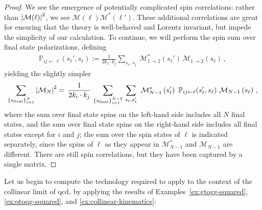 \begin{proof}
We see the emergence of potentially complicated spin correlations:
%
rather than \(\abs{\mathcal{M}(\ell)}^2\), we see \(\mathcal{M}(\ell) \mathcal{M}^*(\ell')\).
%
These additional correlations are great for ensuring that the theory is well-behaved and Lorentz invariant, but impede the simplicity of our calculation.
%
To continue, we will perform the spin sum over final state polarizations, defining
%
%
\begin{align}
    \mathbb{P}_{ij \leftarrow \ell}(s_\ell', s_\ell)
    :=
    \frac{1}{2 k_i \cdot k_j}
    \sum_{s_i,\, s_j}
    \,
    \mathcal{M}^*_{1 \to 2}(s_\ell')
    \,
    \mathcal{M}_{1 \to 2}(s_\ell)
    \,,
\end{align}
yielding the slightly simpler
\begin{align}
    \sum_{\{s_\text{final}\}_{i=1}^N}
    \abs{\mathcal{M}_N}^2
    =
    \,
    \frac{1}{2 k_i \cdot k_j}
    \,
    \sum_{\{s_\text{final}\}_{i=1}^{N-2}}
    \,
    \sum_{s_\ell, s_\ell'}
    \,\,
    \mathcal{M}^*_{N-1}\left(s_\ell'\right)
    \,\,
    \mathbb{P}_{ij \leftarrow \ell}(s_\ell', s_\ell)
    \,\,
    \mathcal{M}_{N-1}\left(s_\ell\right)
    \,,
\end{align}
where the sum over final state spins on the left-hand side includes all \(N\) final states, and the sum over final state spins on the right-hand side includes all final states except for \(i\) and \(j\);
%
the sum over the spin states of \(\ell\) is indicated separately, since the spins of \(\ell\) as they appear in \(\mathcal{M}_{N-1}^*\) and \(\mathcal{M}_{N-1}\) are different.
%
%
There are still spin correlations, but they have been captured by a single matrix.
\end{proof}




Let us begin to compute the technology required to apply  to the context of the collinear limit of \gls{qcd}, by applying the results of Examples~\ref{ex:gtogg-squared}, \ref{ex:qtoqg-squared}, and \ref{ex:collinear-kinematics}:

\begin{example}
    \label{ex:gtogg-split}
\end{example}

\begin{example}
    \label{ex:qtoqg-split}
\end{example}

